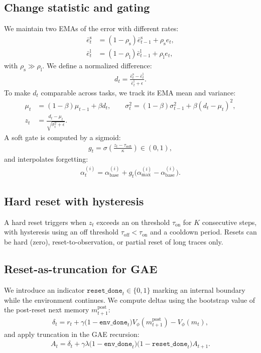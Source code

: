\documentclass{article}
\begin{document}
\subsection{Change statistic and gating}
We maintain two EMAs of the error with different rates:
\begin{align}
\bar{e}_t^{\text{s}} &= (1-\rho_{\text{s}})\bar{e}_{t-1}^{\text{s}} + \rho_{\text{s}} e_t,\\
\bar{e}_t^{\text{l}} &= (1-\rho_{\text{l}})\bar{e}_{t-1}^{\text{l}} + \rho_{\text{l}} e_t,
\end{align}
with $\rho_{\text{s}} \gg \rho_{\text{l}}$. We define a normalized difference:
\begin{align}
d_t = \frac{\bar{e}_t^{\text{s}} - \bar{e}_t^{\text{l}}}{\bar{e}_t^{\text{l}} + \epsilon}.
\end{align}
To make $d_t$ comparable across tasks, we track its EMA mean and variance:
\begin{align}
\mu_t &= (1-\beta)\mu_{t-1} + \beta d_t,\qquad
\sigma_t^2 = (1-\beta)\sigma_{t-1}^2 + \beta (d_t-\mu_t)^2,\\
z_t &= \frac{d_t - \mu_t}{\sqrt{\sigma_t^2 + \epsilon}}.
\end{align}
A soft gate is computed by a sigmoid:
\begin{align}
g_t = \sigma\!\left(\frac{z_t - \tau_{\text{soft}}}{\kappa}\right) \in (0,1),
\end{align}
and interpolates forgetting:
\begin{align}
\alpha_t^{(i)} = \alpha_{\text{base}}^{(i)} + g_t\big(\alpha_{\text{max}}^{(i)} - \alpha_{\text{base}}^{(i)}\big).
\end{align}

\subsection{Hard reset with hysteresis}
A hard reset triggers when $z_t$ exceeds an on threshold $\tau_{\text{on}}$ for $K$ consecutive steps, with hysteresis using an off threshold $\tau_{\text{off}} < \tau_{\text{on}}$ and a cooldown period. Resets can be hard (zero), reset-to-observation, or partial reset of long traces only.

\subsection{Reset-as-truncation for GAE}
We introduce an indicator $\texttt{reset\_done}_t \in \{0,1\}$ marking an internal boundary while the environment continues. We compute deltas using the bootstrap value of the post-reset next memory $m_{t+1}^{\text{post}}$:
\begin{align}
\delta_t = r_t + \gamma \big(1-\texttt{env\_done}_t\big) V_\phi(m_{t+1}^{\text{post}}) - V_\phi(m_t),
\end{align}
and apply truncation in the GAE recursion:
\begin{align}
A_t = \delta_t + \gamma\lambda \big(1-\texttt{env\_done}_t\big)\big(1-\texttt{reset\_done}_t\big) A_{t+1}.
\end{align}
\end{document}
